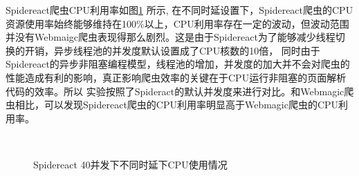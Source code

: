 \documentclass[master]{njuthesis}
\begin{document}
Spidereact爬虫CPU利用率如图\ref{fig:spidereact} 所示, 在不同时延设置下，Spidereact爬虫的CPU资源使用率始终能够维持在100\%以上，CPU利用率存在一定的波动，但波动范围并没有Webmaigc爬虫表现得那么剧烈。这是由于Spidereact为了能够减少线程切换的开销，异步线程池的并发度默认设置成了CPU核数的10倍，
同时由于Spidereact的异步非阻塞编程模型，线程池的增加，并发度的加大并不会对爬虫的性能造成有利的影响，真正影响爬虫效率的关键在于CPU运行非阻塞的页面解析代码的效率。所以
实验按照了Spideract的默认并发度来进行对比。和Webmagic爬虫相比，可以发现Spidereact爬虫的CPU利用率明显高于Webmagic爬虫的CPU利用率。
\begin{figure}[!htbp]
\centering
{}
  \hfill
  \\
  \hfill
\caption{Spidereact 40并发下不同时延下CPU使用情况}\label{fig:spidereact}
\end{figure}
\end{document}
